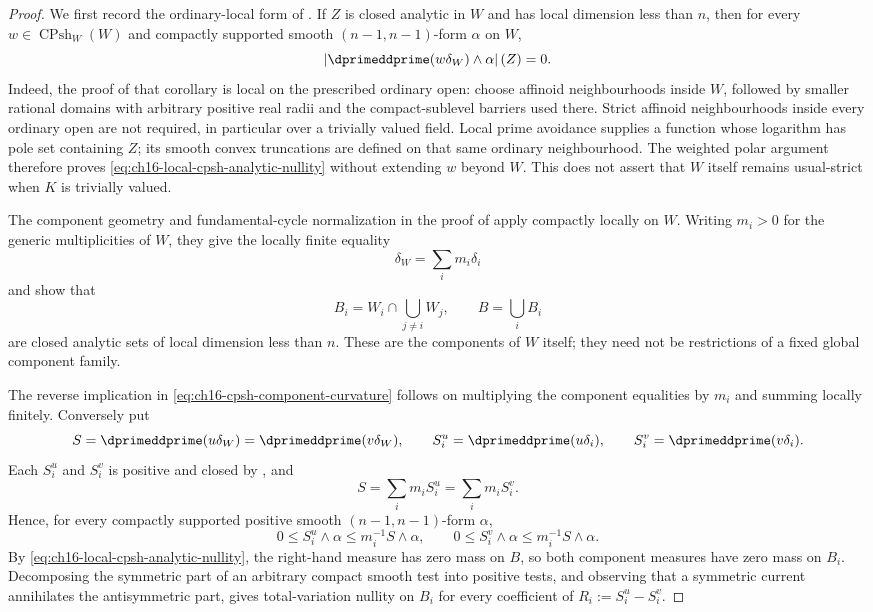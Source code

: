 \begin{proof}
We first record the ordinary-local form of
.  If $Z$ is closed analytic in $W$
and has local dimension less than $n$, then for every
$w\in\operatorname{CPsh}_W(W)$ and compactly supported smooth
$(n-1,n-1)$-form $\alpha$ on $W$,
\begin{equation}
 \left|\dprimeddprime(w\delta_W)\wedge\alpha\right|(Z)=0.
 \label{eq:ch16-local-cpsh-analytic-nullity}
\end{equation}
Indeed, the proof of that corollary is local on the prescribed ordinary
open: choose affinoid neighbourhoods inside $W$, followed by smaller
rational domains with arbitrary positive real radii and the compact-sublevel
barriers used there.  Strict affinoid neighbourhoods inside every ordinary
open are not required, in particular over a trivially valued field.  Local prime avoidance supplies a function whose
logarithm has pole set containing $Z$; its smooth convex truncations are
defined on that same ordinary neighbourhood.  The weighted polar argument
therefore proves \eqref{eq:ch16-local-cpsh-analytic-nullity} without
extending $w$ beyond $W$.  This does not assert that $W$ itself remains
usual-strict when $K$ is trivially valued.

The component geometry and fundamental-cycle normalization in the proof of
 apply compactly locally on $W$.
Writing $m_i>0$ for the generic multiplicities of $W$, they give the
locally finite equality
\[
                         \delta_W=\sum_i m_i\delta_i
\]
and show that
\[
 B_i=W_i\cap\bigcup_{j\ne i}W_j,
 \qquad B=\bigcup_i B_i
\]
are closed analytic sets of local dimension less than $n$.  These are the
components of $W$ itself; they need not be restrictions of a fixed global
component family.

The reverse implication in
\eqref{eq:ch16-cpsh-component-curvature} follows on multiplying the
component equalities by $m_i$ and summing locally finitely.  Conversely put
\[
 S=\dprimeddprime(u\delta_W)=\dprimeddprime(v\delta_W),
 \qquad S_i^u=\dprimeddprime(u\delta_i),\qquad
 S_i^v=\dprimeddprime(v\delta_i).
\]
Each $S_i^u$ and $S_i^v$ is positive and closed by
, and
\[
                    S=\sum_i m_iS_i^u=\sum_i m_iS_i^v .
\]
Hence, for every compactly supported positive smooth
$(n-1,n-1)$-form $\alpha$,
\[
 0\leq S_i^u\wedge\alpha\leq m_i^{-1}S\wedge\alpha,
 \qquad
 0\leq S_i^v\wedge\alpha\leq m_i^{-1}S\wedge\alpha.
\]
By \eqref{eq:ch16-local-cpsh-analytic-nullity}, the right-hand measure
has zero mass on $B$, so both component measures have zero mass on $B_i$.
Decomposing the symmetric part of an arbitrary compact smooth test into
positive tests, and observing that a symmetric current annihilates the
antisymmetric part, gives total-variation nullity on $B_i$ for every
coefficient of $R_i:=S_i^u-S_i^v$.


\end{proof}
